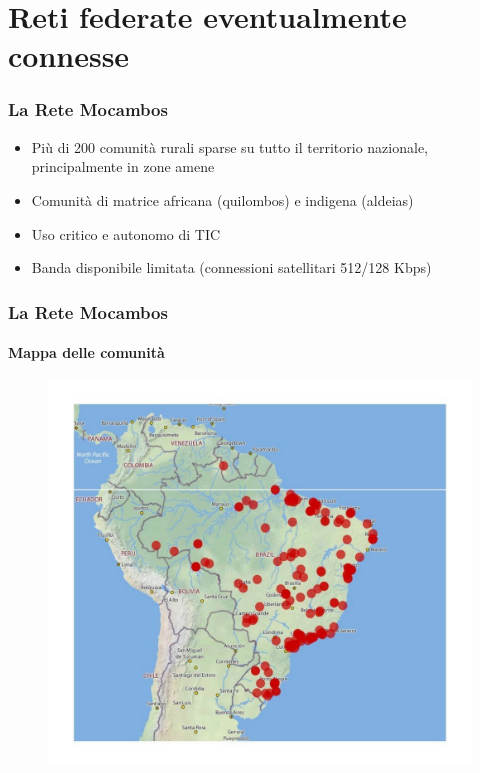 \documentclass{beamer}
\begin{document}
\section{Reti federate eventualmente connesse}

{

\begin{frame}
  \frametitle{La Rete Mocambos}
  \begin{itemize}
    \item Più di 200 comunità rurali sparse su tutto il territorio
      nazionale, principalmente in zone amene
    \item Comunità di matrice africana (quilombos) e indigena (aldeias)
    \item Uso critico e autonomo di TIC
    \item Banda disponibile limitata (connessioni satellitari 512/128 Kbps)
    \end{itemize}

\end{frame}
}

\begin{frame}
  \frametitle{La Rete Mocambos}
  \framesubtitle{Mappa delle comunità}
	\begin{figure}
		\includegraphics[height=0.7\textheight]{./Figure/MappaRedeMocambos.pdf}
	\end{figure}
\end{frame}
\end{document}
